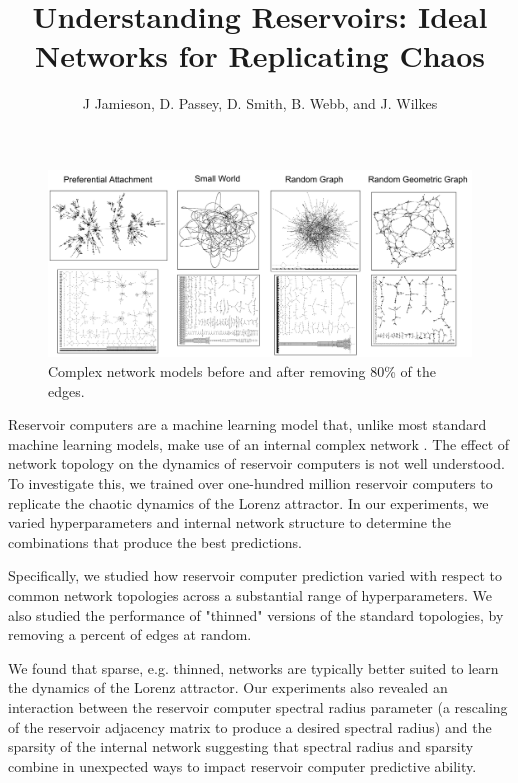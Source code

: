 \documentclass[12pt]{article}
\begin{document}
\title{\normalsize\bf%
Understanding Reservoirs: Ideal Networks for Replicating Chaos}
\vspace{-0.5in}
\author{\vspace{-0.25in} J Jamieson, D. Passey, D. Smith,  B. Webb, and J. Wilkes\\
}

\date{\vspace{-5ex}} %

\maketitle

\thispagestyle{empty}
\pagestyle{empty}


\normalsize \vspace{-.25in}

\begin{figure}[h]
\centering
\includegraphics[width=.6\columnwidth]{networkthinning.png}
\caption{Complex network models before and after removing 80\% of the edges.}
\label{fig:nets}
\end{figure}
Reservoir computers are a machine learning model that, unlike most standard machine learning models, make use of an internal complex network \cite{review}. The effect of network topology on the dynamics of reservoir computers is not well understood. To investigate this, we trained over one-hundred million reservoir computers to replicate the chaotic dynamics of the Lorenz attractor. In our experiments, we varied hyperparameters and internal network structure to determine the combinations that produce the best predictions.

Specifically, we studied how reservoir computer prediction varied with respect to common network topologies across a substantial range of hyperparameters. We also studied the performance of "thinned" versions of the standard topologies, by removing a percent of edges at random.

We found that sparse, e.g. thinned, networks are typically better suited to learn the dynamics of the Lorenz attractor. Our experiments also revealed an interaction between the reservoir computer spectral radius parameter (a rescaling of the reservoir adjacency matrix to produce a desired spectral radius) and the sparsity of the internal network suggesting that spectral radius and sparsity combine in unexpected ways to impact reservoir computer predictive ability.
\end{document}
